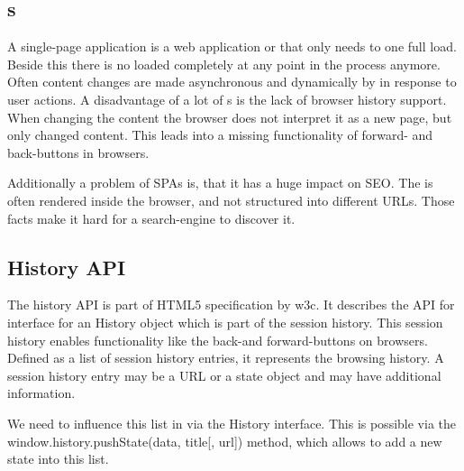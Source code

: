 \subsection{\SinglePageApplication{}s\label{singlePageApplication}}
A single-page application is a web application or \webSite{} that only needs to one full \webPage{} load.
Beside this there is no \webPage{} loaded completely at any point in the process anymore.
Often content changes are made asynchronous and dynamically by \ajax{} in response to user actions.
A disadvantage of a lot of \singlePageApplication{}s is the lack of browser history support.
When changing the content the browser does not interpret it as a new page, but only changed content.
This leads into a missing functionality of forward- and back-buttons in browsers.

Additionally a problem of SPAs is, that it has a huge impact on SEO.
The \webPage{} is often rendered inside the browser, and not structured into different URLs.
Those facts make it hard for a search-engine to discover it.

\subsection{History API}
The history API is part of HTML5 specification by \gls{w3c}.
It describes the API for interface for an History object which is part of the session history.
This session history enables functionality like the back-and forward-buttons on browsers.
Defined as a list of session history entries, it represents the browsing history.
A session history entry may be a URL or a state object and may have additional information.

We need to influence this list in \lare{} via the History interface.
This is possible via the window.history.pushState(data, title[, url]) method, which allows to add a new state into this list.

